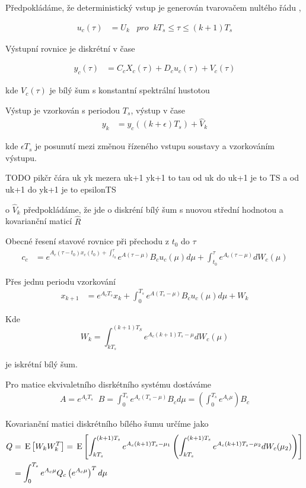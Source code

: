 Předpokládáme, že deterministický vstup je generován tvarovačem nultého řádu ,

\begin{align}
  u_c(\tau) &= U_k \;\;\; pro \;\; k T_s \leq \tau \leq (k+1) T_s
\end{align}

Výstupní rovnice je diskrétní v čase

\begin{align}
  y_c(\tau) &= C_c X_c (\tau) + D_c u_c (\tau) + V_c (\tau)
\end{align}

kde $V_c (\tau)$ je bílý šum s konstantní spektrální hustotou

Výstup je vzorkován s periodou $T_s$, výstup v čase
\begin{align}
  y_k &= y_c ((k+ \epsilon)T_s) + \hat{V}_k
\end{align}

kde $\epsilon T_s$ je posunutí mezi změnou řízeného vstupu soustavy a vzorkováním výstupu.

TODO pikčr čára uk yk mezera uk+1 yk+1 to tau
od uk do uk+1 je to TS a od uk+1 do yk+1 je to epsilonTS

o $\hat{V}_k$ předpokládáme, že jde o diskréní bílý šum s nuovou střední hodnotou a kovarianční maticí $\hat{R}$


Obecné řesení stavové rovnice při přechodu z $t_0$ do $\tau$
\begin{align}
  c_c &= e^{A_c (\tau - t_0)  x_c(t_0) + \int_{t_{0}}^{\tau}} e^{A(\tau- \mu)} B_c u_c(\mu) d \mu + \int_{t_{0}}^{\tau} e^{A_c(\tau-\mu)} dW_c(\mu)
\end{align}

Přes jednu periodu vzorkování
\begin{align}
  x_{k+1} &= e^{A_cT_s} x_k +  \int_{0}^{T_{s}} e^{A(T_s- \mu)} B_c u_c(\mu) d \mu + W_k
\end{align}

Kde \[ W_k = \int_{k T_s}^{(k+1)T_S} e^{A_c(k+1)T_s - \mu} d W_c (\mu) \]

je iskrétní bílý šum.

Pro matice ekvivaletního disrkétního systému dostáváme
\begin{align}
  A =e^{A_c T_s} \;\; B = \int_0^{T_s} e^{A_c(T_s-\mu)} B_c d\mu = \left( \int_0^{T_s} e^{A_c\mu} \right) B_c
\end{align}

Kovarianční matici diskrétního bílého šumu určíme jako
\begin{align}
  Q&= \,\mathrm{E}\left[W_k W_k^T\right] = \,\mathrm{E}\left[\int^{(k+1)T_s}_{kT_s} e^{A_c(k+1)T_s-\mu_1} \left( \int^{(k+1)T_s}_{k T_s} e^{A_c (k+1) T_s - \mu_2} d W_c(\mu_2) \right)  \right] \\
  &= \int_0^{T_s} e^{A_c \mu} Q_c \left( e^{A_c \mu} \right)^T d \mu
\end{align}


